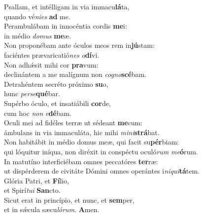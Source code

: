 \evenverse Psallam, et intélligam in via immacu\textbf{lá}ta,~\*\\
\evenverse quando vé\textit{ni}\textit{es} \textbf{ad} me.\\
\oddverse Perambulábam in innocéntia cordis \textbf{me}i:~\*\\
\oddverse in médio \textit{do}\textit{mus} \textbf{me}æ.\\
\evenverse Non proponébam ante óculos meos rem in\textbf{jú}stam:~\*\\
\evenverse faciéntes prævaricatió\textit{nes} \textit{o}\textbf{dí}vi.\\
\oddverse Non adhǽsit mihi cor \textbf{pra}vum:~\*\\
\oddverse declinántem a me malígnum non \textit{co}\textit{gno}\textbf{scé}bam.\\
\evenverse Detrahéntem secréto próximo \textbf{su}o,~\*\\
\evenverse hunc \textit{per}\textit{se}\textbf{qué}bar.\\
\oddverse Supérbo óculo, et insatiábili \textbf{cor}de,~\*\\
\oddverse cum hoc \textit{non} \textit{e}\textbf{dé}bam.\\
\evenverse Oculi mei ad fidéles terræ ut sédeant \textbf{me}cum:~\*\\
\evenverse ámbulans in via immaculáta, hic mihi \textit{mi}\textit{ni}\textbf{strá}bat.\\
\oddverse Non habitábit in médio domus meæ, qui facit su\textbf{pér}biam:~\*\\
\oddverse qui lóquitur iníqua, non diréxit in conspéctu oculó\textit{rum} \textit{me}\textbf{ó}rum.\\
\evenverse In matutíno interficiébam omnes peccatóres \textbf{ter}ræ:~\*\\
\evenverse ut dispérderem de civitáte Dómini omnes operántes i\textit{ni}\textit{qui}\textbf{tá}tem.\\
\oddverse Glória Patri, et \textbf{Fí}lio,~\*\\
\oddverse et Spirí\textit{tu}\textit{i} \textbf{San}cto.\\
\evenverse Sicut erat in princípio, et nunc, et \textbf{sem}per,~\*\\
\evenverse et in sǽcula sæcu\textit{ló}\textit{rum}. \textbf{A}men.\\
